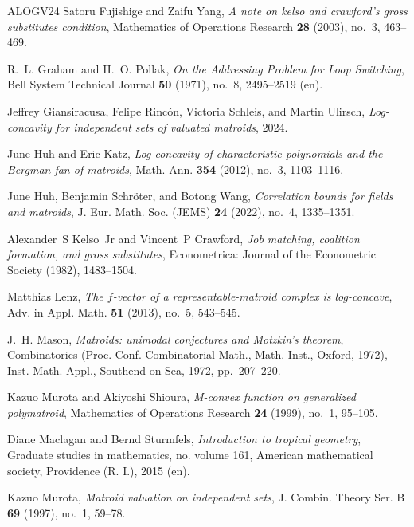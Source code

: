 \documentclass{amsart}
\theoremstyle{definition}
\theoremstyle{remark}
\newcommand{\1}{\mathbf{1}}
\numberwithin{equation}{section}
\begin{document}
\begin{thebibliography}{ALOGV24}
Satoru Fujishige and Zaifu Yang, \emph{A note on kelso and crawford's gross
  substitutes condition}, Mathematics of Operations Research \textbf{28}
  (2003), no.~3, 463--469.

R.~L. Graham and H.~O. Pollak, \emph{On the {Addressing} {Problem} for {Loop}
  {Switching}}, Bell System Technical Journal \textbf{50} (1971), no.~8,
  2495--2519 (en).

Jeffrey Giansiracusa, Felipe Rincón, Victoria Schleis, and Martin Ulirsch,
  \emph{Log-concavity for independent sets of valuated matroids}, 2024.

June Huh and Eric Katz, \emph{{Log-concavity of characteristic polynomials and
  the Bergman fan of matroids}}, Math. Ann. \textbf{354} (2012), no.~3,
  1103--1116.

June Huh, Benjamin Schr\"oter, and Botong Wang, \emph{Correlation bounds for
  fields and matroids}, J. Eur. Math. Soc. (JEMS) \textbf{24} (2022), no.~4,
  1335--1351. 

Alexander~S Kelso~Jr and Vincent~P Crawford, \emph{Job matching, coalition
  formation, and gross substitutes}, Econometrica: Journal of the Econometric
  Society (1982), 1483--1504.

Matthias Lenz, \emph{The {$f$}-vector of a representable-matroid complex is
  log-concave}, Adv. in Appl. Math. \textbf{51} (2013), no.~5, 543--545.

J.~H. Mason, \emph{Matroids: unimodal conjectures and {M}otzkin's theorem},
  Combinatorics ({P}roc. {C}onf. {C}ombinatorial {M}ath., {M}ath. {I}nst.,
  {O}xford, 1972), Inst. Math. Appl., Southend-on-Sea, 1972, pp.~207--220.

Kazuo Murota and Akiyoshi Shioura, \emph{M-convex function on generalized
  polymatroid}, Mathematics of Operations Research \textbf{24} (1999), no.~1,
  95--105.

Diane Maclagan and Bernd Sturmfels, \emph{Introduction to tropical geometry},
  Graduate studies in mathematics, no. volume 161, American mathematical
  society, Providence (R. I.), 2015 (en).

Kazuo Murota, \emph{Matroid valuation on independent sets}, J. Combin. Theory
  Ser. B \textbf{69} (1997), no.~1, 59--78. 


\end{thebibliography}
\end{document}
